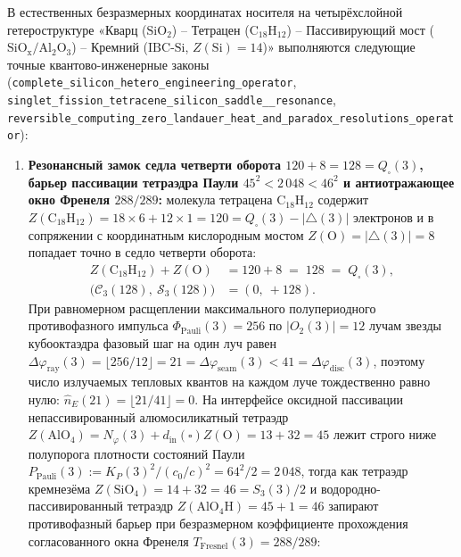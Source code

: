 \begin{theorem}[Резонансный замок седла $120 + 8 = 128 = Q_\square(3)$, барьер оболочечной пассивации $45^2 < 2\,048 < 46^2$, окно Френеля $288/289$ и безветвевая кремниевая архитектура в беспотерьном коридоре]
\label{thm:mono-silicon-photocascade-128}
В естественных безразмерных координатах носителя на четырёхслойной гетероструктуре «Кварц ($\mathrm{SiO_2}$) -- Тетрацен ($\mathrm{C_{18}H_{12}}$) -- Пассивирующий мост ($\mathrm{SiO_x}/\mathrm{Al_2O_3}$) -- Кремний ($\mathrm{IBC\text{-}Si}$, $Z(\mathrm{Si})=14$)» выполняются следующие точные квантово-инженерные законы (\texttt{complete\_\allowbreak silicon\_\allowbreak hetero\_\allowbreak engineering\_\allowbreak operator}, \texttt{singlet\_\allowbreak fission\_\allowbreak tetracene\_\allowbreak silicon\_\allowbreak saddle\_\_\allowbreak resonance}, \texttt{reversible\_\allowbreak computing\_\allowbreak zero\_\allowbreak landauer\_\allowbreak heat\_\allowbreak and\_\allowbreak paradox\_\allowbreak resolutions\_\allowbreak operator}):
\begin{enumerate}[label=\textbf{(\arabic*)},leftmargin=*]
\item \textbf{Резонансный замок седла четверти оборота $120 + 8 = 128 = Q_\square(3)$, барьер пассивации тетраэдра Паули $45^2 < 2\,048 < 46^2$ и антиотражающее окно Френеля $288/289$:}
  молекула тетрацена $\mathrm{C_{18}H_{12}}$ содержит $Z(\mathrm{C_{18}H_{12}}) = 18\times 6 + 12\times 1 = 120 = Q_\square(3) - |{\triangle}(3)|$ электронов и в сопряжении с координатным кислородным мостом $Z(\mathrm{O}) = |{\triangle}(3)| = 8$ попадает точно в седло четверти оборота:
  \begin{align}
    Z(\mathrm{C_{18}H_{12}}) + Z(\mathrm{O}) &= 120 + 8 \;=\; 128 \;=\; Q_\square(3), \label{eq:mono-tetracene-128-lock} \\
    \bigl(\mathcal{C}_3(128),\ \mathcal{S}_3(128)\bigr) &= (0,\ +128). \label{eq:mono-tetracene-128-cs}
  \end{align}
  При равномерном расщеплении максимального полупериодного противофазного импульса $\Phi_{\mathrm{Pauli}}(3) = 256$ по $|O_2(3)| = 12$ лучам звезды кубооктаэдра фазовый шаг на один луч равен $\Delta\varphi_{\mathrm{ray}}(3) = \lfloor 256 / 12 \rfloor = 21 = \Delta\varphi_{\mathrm{seam}}(3) < 41 = \Delta\varphi_{\mathrm{disc}}(3)$, поэтому число излучаемых тепловых квантов на каждом луче тождественно равно нулю: $\hat{n}_E(21) = \lfloor 21 / 41 \rfloor = 0$. На интерфейсе оксидной пассивации непассивированный алюмосиликатный тетраэдр $Z(\mathrm{AlO_4}) = N_\varphi(3) + d_{\mathrm{in}}(\square)Z(\mathrm{O}) = 13 + 32 = 45$ лежит строго ниже полупорога плотности состояний Паули $P_{\mathrm{Pauli}}(3) := K_P(3)^2 / (c_0/c)^2 = 64^2 / 2 = 2\,048$, тогда как тетраэдр кремнезёма $Z(\mathrm{SiO_4}) = 14 + 32 = 46 = S_3(3)/2$ и водородно-пассивированный тетраэдр $Z(\mathrm{AlO_4H}) = 45 + 1 = 46$ запирают противофазный барьер при безразмерном коэффициенте прохождения согласованного окна Френеля $T_{\mathrm{Fresnel}}(3) = 288/289$:

\end{enumerate}
\end{theorem}
